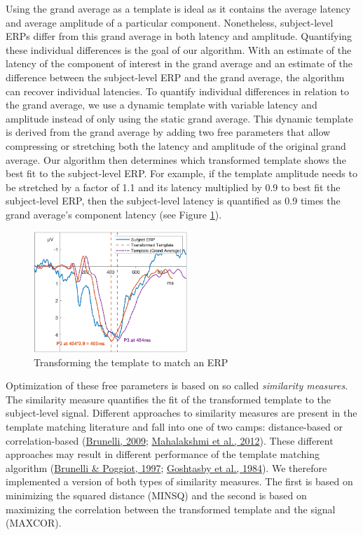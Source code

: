 \documentclass[
  man]{apa7}
\begin{document}
Using the grand average as a template is ideal as it contains the average latency and average amplitude of a particular component. Nonetheless, subject-level ERPs differ from this grand average in both latency and amplitude. Quantifying these individual differences is the goal of our algorithm. With an estimate of the latency of the component of interest in the grand average and an estimate of the difference between the subject-level ERP and the grand average, the algorithm can recover individual latencies. To quantify individual differences in relation to the grand average, we use a dynamic template with variable latency and amplitude instead of only using the static grand average. This dynamic template is derived from the grand average by adding two free parameters that allow compressing or stretching both the latency and amplitude of the original grand average. Our algorithm then determines which transformed template shows the best fit to the subject-level ERP. For example, if the template amplitude needs to be stretched by a factor of 1.1 and its latency multiplied by 0.9 to best fit the subject-level ERP, then the subject-level latency is quantified as 0.9 times the grand average's component latency (see Figure \ref{fig:introduction-example-img}).



\begin{figure}
\includegraphics[width=2.28in]{../images/template_matching_example_introduction} \caption{Transforming the template to match an ERP}\label{fig:introduction-example-img}
\end{figure}

Optimization of these free parameters is based on so called \emph{similarity measures}. The similarity measure quantifies the fit of the transformed template to the subject-level signal. Different approaches to similarity measures are present in the template matching literature and fall into one of two camps: distance-based or correlation-based (\protect\hyperlink{ref-brunelli2009template}{Brunelli, 2009}; \protect\hyperlink{ref-mahalakshmi2012image}{Mahalakshmi et al., 2012}). These different approaches may result in different performance of the template matching algorithm (\protect\hyperlink{ref-brunelli1997template}{Brunelli \& Poggiot, 1997}; \protect\hyperlink{ref-goshtasby1984two}{Goshtasby et al., 1984}). We therefore implemented a version of both types of similarity measures. The first is based on minimizing the squared distance (MINSQ) and the second is based on maximizing the correlation between the transformed template and the signal (MAXCOR).
\end{document}
